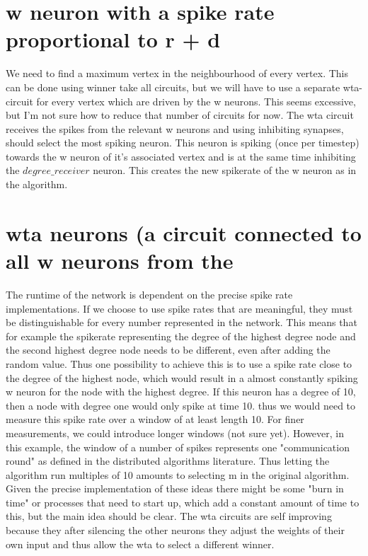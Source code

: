 \section{w neuron with a spike rate proportional to r + d}\label{sec:weight_neuron}
We need to find a maximum vertex in the neighbourhood of every vertex. This
can be done using winner take all circuits, but we will have to use a separate
wta-circuit for every vertex which are driven by the w neurons. This seems
excessive, but I'm not sure how to reduce that number of circuits for now. The
wta circuit receives the spikes from the relevant w neurons and using inhibiting synapses, should select the most spiking neuron. This neuron is spiking (once
per timestep) towards the w neuron of it's associated vertex and is at the same
time inhibiting the $degree\_receiver$ neuron. This creates the new spikerate of
the w neuron as in the algorithm.

\section{wta neurons (a circuit connected to all w neurons from the}\label{sec:wta_circuits}

The runtime of the network is dependent on the precise spike rate
implementations. If we choose to use spike rates that are meaningful, they
must be distinguishable for every number represented in the network. This
means that for example the spikerate representing the degree of the highest
degree node and the second highest degree node needs to be different, even
after adding the random value. Thus one possibility to achieve this is to use a
spike rate close to the degree of the highest node, which would result in a
almost constantly spiking w neuron for the node with the highest degree. If this
neuron has a degree of 10, then a node with degree one would only spike at
time 10. thus we would need to measure this spike rate over a window of at
least length 10. For finer measurements, we could introduce longer windows
(not sure yet). However, in this example, the window of a number of spikes
represents one "communication round" as defined in the distributed algorithms
literature. Thus letting the algorithm run multiples of 10 amounts to selecting m
in the original algorithm. Given the precise implementation of these ideas there
might be some "burn in time" or processes that need to start up, which add a
constant amount of time to this, but the main idea should be clear. The wta
circuits are self improving because they after silencing the other neurons they
adjust the weights of their own input and thus allow the wta to select a different
winner.
